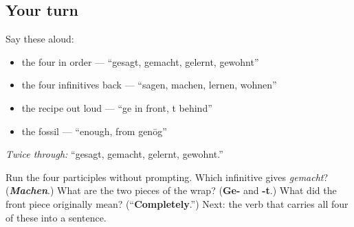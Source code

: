 \subsection*{Your turn}
Say these aloud:

\begin{itemize}
\raggedright
  \item the four in order — \textquotedblleft{}gesagt, gemacht, gelernt, gewohnt\textquotedblright{}
  \item the four infinitives back — \textquotedblleft{}sagen, machen, lernen, wohnen\textquotedblright{}
  \item the recipe out loud — \textquotedblleft{}ge in front, t behind\textquotedblright{}
  \item the fossil — \textquotedblleft{}enough, from genōg\textquotedblright{}
\end{itemize}

\emph{Twice through:} \textquotedblleft{}gesagt, gemacht, gelernt, gewohnt.\textquotedblright{}

\begin{tcolorbox}[breakable,colback=teal!4,colframe=teal!35!black,title={Before you move on}]
Run the four participles without prompting. Which infinitive gives \emph{gemacht}? (\emph{\textbf{Machen}}.) What are the two pieces of the wrap? (\textbf{Ge-} and \textbf{-t}.) What did the front piece originally mean? (\textquotedblleft{}\textbf{Completely}.\textquotedblright{}) Next: the verb that carries all four of these into a sentence.
\end{tcolorbox}
